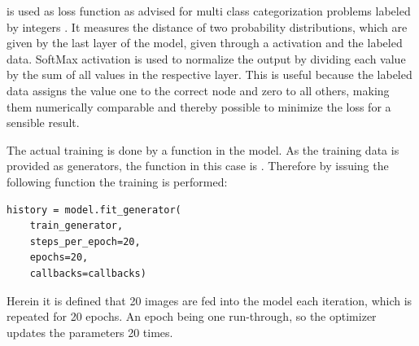  is used as loss function as advised for multi class categorization problems labeled by integers \cite[p.84]{Chollet2017}.
It measures the distance of two probability distributions, which are given by the last layer of the model, given through a  activation and the labeled data.
SoftMax activation is used to normalize the output by dividing each value by the sum of all values in the respective layer.
This is useful because the labeled data assigns the value one to the correct node and zero to all others, making them numerically comparable and thereby possible to minimize the loss for a sensible result.

The actual training is done by a  function in the model.
As the training data is provided as generators, the function in this case is .
Therefore by issuing the following function the training is performed:
\begin{lstlisting}
history = model.fit_generator(
    train_generator,
    steps_per_epoch=20,
    epochs=20,
    callbacks=callbacks)
\end{lstlisting}

Herein it is defined that 20 images are fed into the model each iteration, which is repeated for 20 epochs.
An epoch being one run-through, so the optimizer updates the parameters 20 times.

